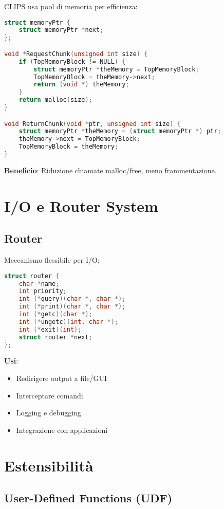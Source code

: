 CLIPS usa pool di memoria per efficienza:

\begin{lstlisting}[language=C]
struct memoryPtr {
    struct memoryPtr *next;
};

void *RequestChunk(unsigned int size) {
    if (TopMemoryBlock != NULL) {
        struct memoryPtr *theMemory = TopMemoryBlock;
        TopMemoryBlock = theMemory->next;
        return (void *) theMemory;
    }
    return malloc(size);
}

void ReturnChunk(void *ptr, unsigned int size) {
    struct memoryPtr *theMemory = (struct memoryPtr *) ptr;
    theMemory->next = TopMemoryBlock;
    TopMemoryBlock = theMemory;
}
\end{lstlisting}

\textbf{Beneficio}: Riduzione chiamate malloc/free, meno frammentazione.

\section{I/O e Router System}

\subsection{Router}

Meccanismo flessibile per I/O:

\begin{lstlisting}[language=C]
struct router {
    char *name;
    int priority;
    int (*query)(char *, char *);
    int (*print)(char *, char *);
    int (*getc)(char *);
    int (*ungetc)(int, char *);
    int (*exit)(int);
    struct router *next;
};
\end{lstlisting}

\textbf{Usi}:
\begin{itemize}
\item Redirigere output a file/GUI
\item Interceptare comandi
\item Logging e debugging
\item Integrazione con applicazioni
\end{itemize}

\section{Estensibilità}

\subsection{User-Defined Functions (UDF)}

